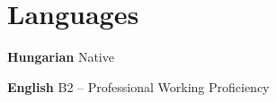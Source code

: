 \section{Languages}
\textbf{Hungarian}
\hfill
{\color{subtle} Native}

\textbf{English}
\hfill
{\color{subtle} B2 – Professional Working Proficiency}